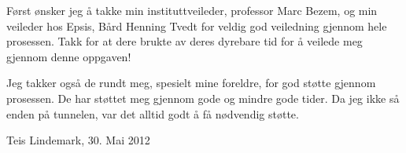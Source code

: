 Først ønsker jeg å takke min instituttveileder, professor Marc Bezem, og min veileder hos Epsis, Bård Henning Tvedt for veldig god veiledning gjennom hele prosessen. Takk for at dere brukte av deres dyrebare tid for å veilede meg gjennom denne oppgaven!

Jeg takker også de rundt meg, spesielt mine foreldre, for god støtte gjennom prosessen. De har støttet meg gjennom gode og mindre gode tider. Da jeg ikke så enden på tunnelen, var det alltid godt å få nødvendig støtte.

Teis Lindemark, 30. Mai 2012